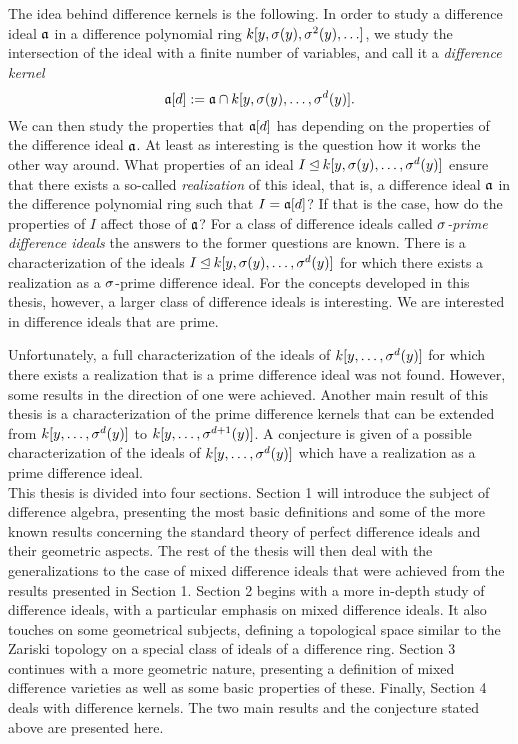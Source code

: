 The idea behind difference kernels is the following.
In order to study a difference ideal $\mathfrak{a}$ in a difference polynomial ring $k[y,\sigma(y),\sigma^2(y),\ldots]$,
we study the intersection of the ideal with a finite number of variables, and call it a \emph{difference kernel} $$\mathfrak{a}[d] := \mathfrak{a} \cap k[y,\sigma(y),\ldots,\sigma^d(y)].$$
We can then study the properties that $\mathfrak{a}[d]$ has depending on the properties of the difference ideal $\mathfrak{a}$. At least as interesting is the question how it works the other way around.
What properties of an ideal $I \unlhd k[y,\sigma(y),\ldots,\sigma^d(y)]$ ensure that there exists a so-called \emph{realization} of this ideal, that is, a difference ideal $\mathfrak{a}$ in the difference polynomial ring such that $I = \mathfrak{a}[d]$?
 If that is the case, how do the properties of $I$ affect those of $\mathfrak{a}$?
For a class of difference ideals called \emph{$\sigma$-prime difference ideals} the answers to the former questions are known. 
There is a characterization of the ideals $I \unlhd k[y,\sigma(y),\ldots,\sigma^d(y)]$ for which there exists a realization as a $\sigma$-prime difference ideal. 
For the concepts developed in this thesis, however, a larger class of difference ideals is interesting. We are interested in difference ideals that are prime. 

Unfortunately, a full characterization of the ideals of $k[y,\ldots,\sigma^d(y)]$ for which there exists a realization that is a prime difference ideal was not found. However, some results in the direction of one were achieved. Another main result of this thesis is a characterization of the prime difference kernels that 
can be extended from $k[y,\ldots,\sigma^d(y)]$ to $k[y,\ldots,\sigma^{d+1}(y)]$. A conjecture is given of a possible characterization of the ideals of $k[y,\ldots,\sigma^d(y)]$
which have a realization as a prime difference ideal. \\


This thesis is divided into four sections. Section 1 will introduce the subject of difference algebra, presenting the most basic definitions and some of the more known results concerning the standard theory of perfect difference ideals and their geometric aspects.
The rest of the thesis will then deal with the generalizations  to the case of mixed difference ideals that were achieved from the results presented in Section 1. 
Section 2 begins with a more in-depth study of difference ideals, with a particular emphasis on mixed difference ideals. It also touches on some geometrical subjects, defining a topological space similar to the Zariski topology on a special class of ideals of a difference ring.
Section 3 continues with a more geometric nature, presenting a definition of mixed difference varieties as well as some basic properties of these. 
Finally, Section 4 deals with difference kernels. The two main results and the conjecture stated above are presented here.
